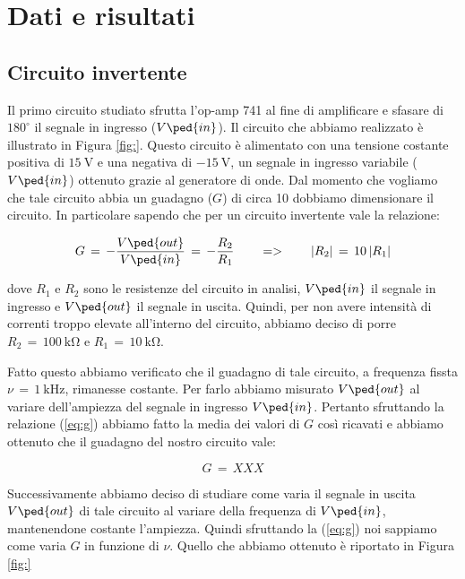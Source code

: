 \section*{Dati e risultati}

\subsection*{Circuito invertente}

Il primo circuito studiato sfrutta l'op-amp 741 al fine di amplificare e sfasare di $180^\circ$ il segnale in ingresso ($V\ped{in}$). Il circuito che abbiamo realizzato è illustrato in Figura \ref{fig:}.
Questo circuito è alimentato con una tensione costante positiva di $\SI{+15}{\volt}$ e una negativa di $\SI{-15}{\volt}$, un segnale in ingresso variabile ($V\ped{in}$) ottenuto grazie al generatore di onde.
Dal momento che vogliamo che tale circuito abbia un guadagno ($G$) di circa 10 dobbiamo dimensionare il circuito. In particolare sapendo che per un circuito invertente vale la relazione:

\begin{equation}
        G\,=\,-\frac{V\ped{out}}{V\ped{in}}\,=\,-\frac{R_2}{R_1} \qquad => \qquad |R_2|\,=\,10\,|R_1|
        \label{eq:g}
\end{equation}

dove $R_1$ e $R_2$ sono le resistenze del circuito in analisi, $V\ped{in}$ il segnale in ingresso e $V\ped{out}$ il segnale in uscita. Quindi, per non avere intensità di correnti troppo elevate all'interno del circuito, abbiamo deciso di porre $R_2\,=\,\SI{100}{\kilo\ohm}$ e $R_1\,=\,\SI{10}{\kilo\ohm}$.

Fatto questo abbiamo verificato che il guadagno di tale circuito, a frequenza fissta $\nu\,=\,\SI{1}{\kilo\hertz}$, rimanesse costante. Per farlo abbiamo misurato $V\ped{out}$ al variare dell'ampiezza del segnale in ingresso $V\ped{in}$. Pertanto sfruttando la relazione (\ref{eq:g}) abbiamo fatto la media dei valori di $G$ così ricavati e abbiamo ottenuto che il guadagno del nostro circuito vale:

\begin{equation}
        G\,=\, XXX
\end{equation}

Successivamente abbiamo deciso di studiare come varia il segnale in uscita $V\ped{out}$ di tale circuito al variare della frequenza di $V\ped{in}$, mantenendone costante l'ampiezza. Quindi sfruttando la (\ref{eq:g}) noi sappiamo come varia $G$ in funzione di $\nu$. Quello che abbiamo ottenuto è riportato in Figura \ref{fig:}

